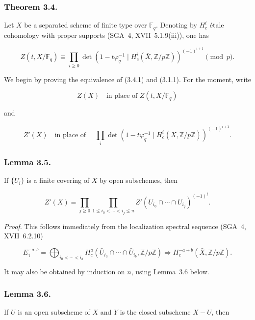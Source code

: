 \subsubsection*{Theorem 3.4.}
Let $X$ be a separated scheme of finite type over $\mathbb F_q$. Denoting by
$H_c^i$ étale cohomology with proper supports (SGA~4, XVII~5.1.9(iii)), one
has

\begin{equation}\tag{3.4.1}
Z(t,X/\mathbb F_q)
\equiv
\prod_{i\geq0}
\det\!\left(1-t\varphi_q^{-1}\mid
H_c^i(\bar X,\mathbb Z/p\mathbb Z)\right)^{(-1)^{i+1}}
\pmod p.
\end{equation}

We begin by proving the equivalence of (3.4.1) and (3.1.1). For the moment,
write

\begin{equation}\tag{3.4.2}
Z(X)\quad\text{in place of }Z(t,X/\mathbb F_q)
\end{equation}

and

\begin{equation}\tag{3.4.3}
Z'(X)\quad\text{in place of }\quad
\prod_i\det\!\left(1-t\varphi_q^{-1}\mid
H_c^i(\bar X,\mathbb Z/p\mathbb Z)\right)^{(-1)^{i+1}}.
\end{equation}

\subsubsection*{Lemma 3.5.}
If $\{U_i\}$ is a finite covering of $X$ by open subschemes, then

\begin{equation}\tag{3.5.1}
Z'(X)=
\prod_{j\geq0}
\prod_{1\leq i_0<\cdots<i_j\leq n}
Z'(U_{i_0}\cap\cdots\cap U_{i_j})^{(-1)^j}.
\end{equation}

\medskip
\noindent\emph{Proof.}
This follows immediately from the localization spectral sequence (SGA~4,
XVII~6.2.10)

\[
E_1^{-a,b}=\bigoplus_{i_0<\cdots<i_b}
H_c^a(\bar U_{i_0}\cap\cdots\cap\bar U_{i_b},\mathbb Z/p\mathbb Z)
\Longrightarrow H_c^{-a+b}(\bar X,\mathbb Z/p\mathbb Z).
\]

It may also be obtained by induction on $n$, using Lemma~3.6 below.

\subsubsection*{Lemma 3.6.}
If $U$ is an open subscheme of $X$ and $Y$ is the closed subscheme $X-U$, then

